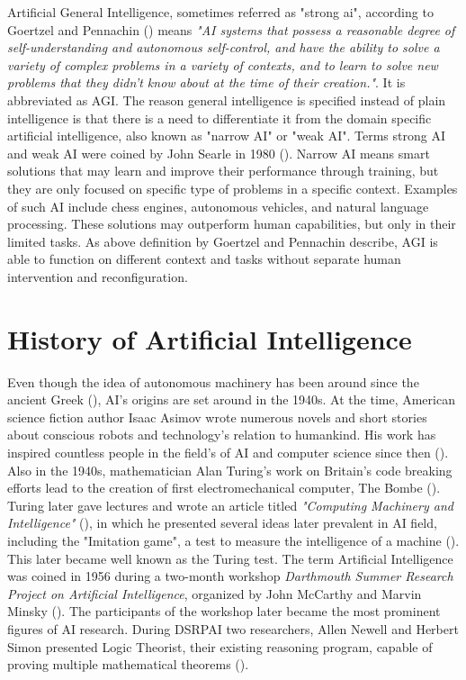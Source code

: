 \documentclass[utf8,english]{gradu3}
\begin{document}
Artificial General Intelligence, sometimes referred as "strong ai", according to Goertzel and Pennachin (\cite*{goertzel2007}) means \emph{"AI systems that possess a reasonable degree of self-understanding and autonomous self-control, and have the ability to solve a variety of complex problems in a variety of contexts, and to learn to solve new problems that they didn't know about at the time of their creation."}. It is abbreviated as AGI. The reason general intelligence is specified instead of plain intelligence is that there is a need to differentiate it from the domain specific artificial intelligence, also known as "narrow AI" or "weak AI". Terms strong AI and weak AI were coined by John Searle in 1980 (\cite{searle1980}). Narrow AI means smart solutions that may learn and improve their performance through training, but they are only focused on specific type of problems in a specific context. Examples of such AI include chess engines, autonomous vehicles, and natural language processing. These solutions may outperform human capabilities, but only in their limited tasks.
As above definition by Goertzel and Pennachin describe, AGI is able to function on different context and tasks without separate human intervention and reconfiguration.


\section{History of Artificial Intelligence} 
% 
Even though the idea of autonomous machinery has been around since the ancient Greek (\cite{}), AI's origins are set around in the 1940s. At the time, American science fiction author Isaac Asimov wrote numerous novels and short stories about conscious robots and technology's relation to humankind. His work has inspired countless people in the field's of AI and computer science since then (\cite{kaplan2019}).
Also in the 1940s, mathematician Alan Turing's work on Britain's code breaking efforts lead to the creation of first electromechanical computer, The Bombe (\cite{kaplan2019}). Turing later gave lectures and wrote an article titled \emph{"Computing Machinery and Intelligence"} (\cite*{turing1950}), in which he presented several ideas later prevalent in AI field, including the "Imitation game", a test to measure the intelligence of a machine (\cite{norvig2002}). This later became well known as the Turing test.
The term Artificial Intelligence was coined in 1956 during a two-month workshop \emph{Darthmouth Summer Research Project on Artificial Intelligence}, organized by John McCarthy and Marvin Minsky (\cite{kaplan2019}). The participants of the workshop later became the most prominent figures of AI research. During DSRPAI two researchers, Allen Newell and Herbert Simon presented Logic Theorist, their existing reasoning program, capable of proving multiple mathematical theorems (\cite{norvig2002}). 
\end{document}
